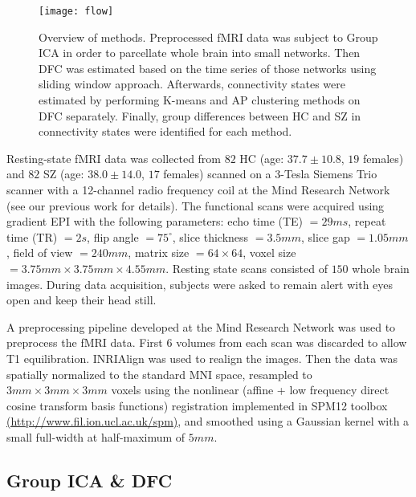 \documentclass{article}
\begin{document}
\begin{figure}
  \centering
  \centerline{\texttt{[image: flow]}}
  \caption{Overview of methods. Preprocessed \acs{fMRI} data was subject to Group \acs{ICA} in order to parcellate whole brain into small networks. Then \ac{DFC} was estimated based on the time series of those networks using sliding window approach. Afterwards, connectivity states were estimated by performing K-means and \acl{AP} clustering methods on \ac{DFC} separately. Finally, group differences between \ac{HC} and \ac{SZ} in connectivity states were identified for each method.}
  \label{fig:Overview}
\end{figure}

Resting-state \ac{fMRI} data was collected from $82$ \ac{HC} (age: $37.7 \pm 10.8$, $19$ females) and $82$ \ac{SZ} (age: $38.0 \pm 14.0$, $17$ females) scanned on a 3-Tesla Siemens Trio scanner with a 12-channel radio frequency coil at the Mind Research Network (see our previous work \cite{du_interaction_2016} for details). The functional scans were acquired using gradient \ac{EPI} with the following parameters: echo time (TE) $= 29ms$, repeat time (TR) $= 2s$, flip angle $= 75^\circ$, slice thickness $= 3.5mm$, slice gap $= 1.05mm$, field of view $= 240mm$, matrix size $= 64\times 64$, voxel size $= 3.75mm\times 3.75mm \times 4.55mm$. Resting state scans consisted of $150$ whole brain images. During data acquisition, subjects were asked to remain alert with eyes open and keep their head still.

A preprocessing pipeline developed at the Mind Research Network \cite{bockholt_mining_2010} was used to preprocess the fMRI data. First $6$ volumes from each scan was discarded to allow T1 equilibration. INRIAlign \cite{freire_what_2002} was used to realign the images. Then the data was spatially normalized to the standard \ac{MNI} space, resampled to $3mm\times 3mm\times 3mm$ voxels using the nonlinear (affine + low frequency direct cosine transform basis functions) registration implemented in SPM12 toolbox \href{http://www.fil.ion.ucl.ac.uk/spm}{(http://www.fil.ion.ucl.ac.uk/spm)}, and smoothed using a Gaussian kernel with a small full-width at half-maximum of $5mm$.

\subsection{Group \ac{ICA} \& \acs{DFC}}
\label{sec:Group}
\end{document}
